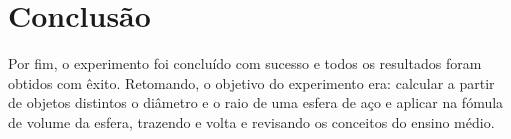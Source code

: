 \documentclass[a4paper, 12pt]{article}
\begin{document}
\section{Conclusão}
Por fim, o experimento foi concluído com sucesso e todos os resultados foram obtidos com êxito. Retomando, o objetivo do experimento era: calcular a partir de objetos distintos o diâmetro e o raio de uma esfera de aço e aplicar na fómula de volume da esfera, trazendo e volta e revisando os conceitos do ensino médio.
\end{document}
